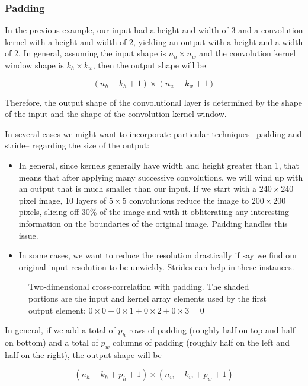 \subsubsection{Padding}

In the previous example, our input had a height and width of 3 and a convolution kernel with a height and width of 2, yielding an output with a height and a width of 2. In general, assuming the input shape is  $n_h \times n_w$  and the convolution kernel window shape is $k_h \times k_w$, then the output shape will be

$$(n_h-k_h+1) \times (n_w-k_w+1)$$
 
Therefore, the output shape of the convolutional layer is determined by the shape of the input and the shape of the convolution kernel window.

In several cases we might want to incorporate particular techniques --padding and stride-- regarding the size of the output:
\begin{itemize}
    \item In general, since kernels generally have width and height greater than 1, that means that after applying many successive convolutions, we will wind up with an output that is much smaller than our input. If we start with a $240\times240$ pixel image, 10 layers of $5\times5$ convolutions reduce the image to $200\times200$ pixels, slicing off 30\% of the image and with it obliterating any interesting information on the boundaries of the original image. Padding handles this issue.
    \item In some cases, we want to reduce the resolution drastically if say we find our original input resolution to be unwieldy. Strides can help in these instances.
\end{itemize}

\begin{figure}[hpt]
    \centering
    
    \caption{Two-dimensional cross-correlation with padding. The shaded portions are the input and kernel array elements used by the first output element: $0\times0+0\times1+0\times2+0\times3=0$}
    \label{fig:conv_pad}
\end{figure}

In general, if we add a total of  $p_h$  rows of padding (roughly half on top and half on bottom) and a total of  $p_w$  columns of padding (roughly half on the left and half on the right), the output shape will be

$$(n_h-k_h+p_h+1)\times(n_w-k_w+p_w+1)$$
 
